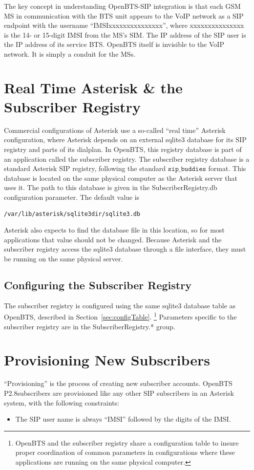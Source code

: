 \documentclass[11pt,openany]{book}
\begin{document}
The key concept in understanding OpenBTS-SIP integration is that each GSM MS in communication with the BTS unit appears to the VoIP network as a SIP endpoint with the username ``IMSIxxxxxxxxxxxxxxx'', where xxxxxxxxxxxxxxx is the 14- or 15-digit IMSI from the MS's SIM.  The IP address of the SIP user is the IP address of its service BTS.  OpenBTS itself is invisible to the VoIP network.  It is simply a conduit for the MSs.


\section{Real Time Asterisk \& the Subscriber Registry}
\label{sec:registry}
Commercial configurations of Asterisk use a so-called ``real time'' Asterisk configuration, where Asterisk depends on an external sqlite3 database for its SIP registry and parts of its dialplan.
In OpenBTS, this registry database is part of an application called the subscriber registry.
The subscriber registry database is a standard Asterisk SIP registry, following the standard $\mathtt{sip\_buddies}$ format.
This database is located on the same physical computer as the Asterisk server that uses it.  The path to this database is given in the SubscriberRegistry.db configuration parameter. 
The default value is
\begin{verbatim}
/var/lib/asterisk/sqlite3dir/sqlite3.db
\end{verbatim}
Asterisk also expects to find the database file in this location, so for most applications that value should not be changed.
Because Asterisk and the subscriber registry access the sqlite3 database through a file interface, they must be running on the same physical server.

\subsection{Configuring the Subscriber Registry}
The subscriber registry is configured using the same sqlite3 database table as OpenBTS, described in Section~\ref{sec:configTable}.%
\footnote{OpenBTS and the subscriber registry share a configuration table to insure proper coordination of common parameters in configurations where these applications are running on the same physical computer.}
Parameters specific to the subscriber registry are in the SubscriberRegistry.* group.




\section{Provisioning New Subscribers}
``Provisioning'' is the process of creating new subscriber accounts.  OpenBTS P2.8subscribers are provisioned like any other SIP subscribers in an Asterisk system, with the following constraints:
\begin{itemize}
	\item The SIP user name is always ``IMSI'' followed by the digits of the IMSI.
\end{itemize}
\end{document}
